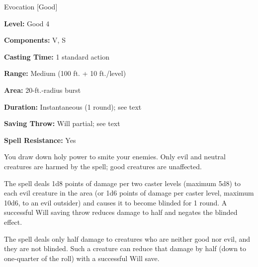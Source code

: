 
Evocation [Good]

\textbf{Level:} Good 4

\textbf{Components:} V, S

\textbf{Casting Time:} 1 standard action

\textbf{Range:} Medium (100 ft. + 10 ft./level)

\textbf{Area:} 20-ft.-radius burst

\textbf{Duration:} Instantaneous (1 round); see text

\textbf{Saving Throw:} Will partial; see text

\textbf{Spell Resistance:} Yes

You draw down holy power to smite your enemies. Only evil and neutral creatures 
are harmed by the spell; good creatures are unaffected.

The spell deals 1d8 points of damage per two caster levels (maximum 5d8) to each 
evil creature in the area (or 1d6 points of damage per caster level, maximum 10d6, 
to an evil outsider) and causes it to become blinded for 1 round. A successful 
Will saving throw reduces damage to half and negates the blinded effect.

The spell deals only half damage to creatures who are neither good nor evil, and 
they are not blinded. Such a creature can reduce that damage by half (down to one-quarter 
of the roll) with a successful Will save.

